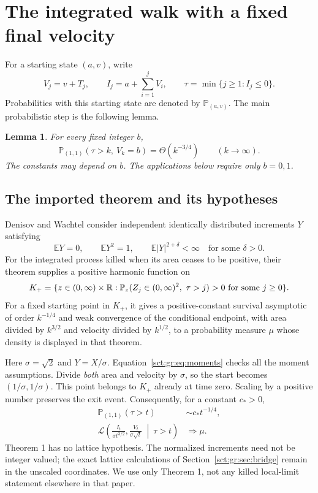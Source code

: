 \documentclass[11pt,letterpaper]{article}
\newtheorem{lemma}[theorem]{Lemma}
\theoremstyle{definition}\newtheorem{remark}[theorem]{Remark}
\newcommand{\Pp}{\mathbb P}\newcommand{\Ee}{\mathbb E}
\begin{document}
\section{The integrated walk with a fixed final velocity}\label{sct:gr:sec:endpoint}

For a starting state $(a,v)$, write
\[
 V_j=v+T_j,\qquad I_j=a+\sum_{i=1}^j V_i,
 \qquad \tau=\min\{j\ge1:I_j\le0\}.
\]
Probabilities with this starting state are denoted by $\Pp_{(a,v)}$.
The main probabilistic step is the following lemma.

\begin{lemma}\label{sct:gr:lem:endpoint}
For every fixed integer $b$,
\begin{equation}\label{sct:gr:eq:endpoint}
 \Pp_{(1,1)}(\tau>k,\ V_k=b)=\Theta(k^{-3/4})
 \qquad(k\to\infty).
\end{equation}
The constants may depend on $b$. The applications below require only $b=0,1$.
\end{lemma}

\subsection{The imported theorem and its hypotheses}

Denisov and Wachtel \cite[Theorem 1, equations (7)--(8), pp.~169--170]{dw}
consider independent identically distributed increments $Y$ satisfying
\[
 \Ee Y=0,\qquad \Ee Y^2=1,\qquad
 \Ee|Y|^{2+\delta}<\infty\quad\text{for some }\delta>0.
\]
For the integrated process killed when its area ceases to be positive, their
theorem supplies a positive harmonic function on
\[
 K_+=\{z\in(0,\infty)\times\R:
 \Pp_z(Z_j\in(0,\infty)^2,\ \tau>j)>0
 \text{ for some }j\ge0\}.
\]
For a fixed starting point in $K_+$, it gives a positive-constant survival
asymptotic of order $k^{-1/4}$ and weak convergence of the conditional endpoint,
with area divided by $k^{3/2}$ and velocity divided by $k^{1/2}$, to a probability
measure $\mu$ whose density is displayed in that theorem.

Here $\sigma=\sqrt2$ and $Y=X/\sigma$. Equation~\eqref{sct:gr:eq:moments}
checks all the moment assumptions. Divide \emph{both} area and velocity by
$\sigma$, so the start becomes $(1/\sigma,1/\sigma)$. This point belongs to
$K_+$ already at time zero. Scaling by a positive number preserves the exit
event. Consequently, for a constant $c_*>0$,
\begin{align}
 \Pp_{(1,1)}(\tau>t)&\sim c_*t^{-1/4},\label{sct:gr:eq:DWsurvival}\\
 \mathcal L\!\left(
 \frac{I_t}{\sigma t^{3/2}},\frac{V_t}{\sigma\sqrt t}
 \ \middle|\ \tau>t\right)&\Longrightarrow\mu.
 \label{sct:gr:eq:DWlimit}
\end{align}
Theorem 1 has no lattice hypothesis. The normalized increments need not be
integer valued; the exact lattice calculations of Section~\ref{sct:gr:sec:bridge}
remain in the unscaled coordinates. We use only Theorem 1, not any killed
local-limit statement elsewhere in that paper.
\end{document}
